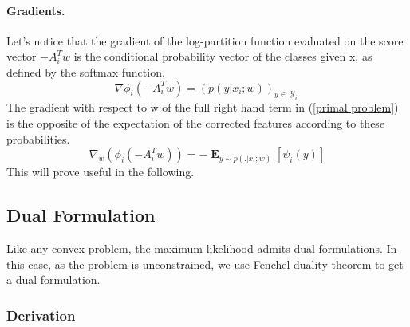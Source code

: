 \documentclass{article}
\DeclareMathOperator{\1}{\mathbb{1}}
\DeclareMathOperator{\E}{\mathbf{E}}
\DeclareMathOperator{\Y}{\mathcal{Y}}
\begin{document}
\paragraph{Gradients.}
Let's notice that the gradient of the log-partition function evaluated on the score vector $-A_i^Tw$ is the conditional probability vector of the classes given x, as defined by the softmax function.
\begin{equation}
	\nabla \phi_i(-A_i^Tw) = (p(y | x_i ; w))_{y \in \Y_i}
\end{equation}
The gradient with respect to w of the full right hand term in (\ref{primal problem}) is the opposite of the expectation of the corrected features according to these probabilities.
\begin{equation}
	\label{primal gradient}
	\nabla_w (\phi_i(-A_i^Tw)) = - \E_{y \sim p(. | x_i ; w)} [\psi_i(y)]
\end{equation}
This will prove useful in the following.

\subsection{Dual Formulation}

Like any convex problem, the maximum-likelihood admits dual formulations.
In this case, as the problem is unconstrained, we use Fenchel duality theorem to get a dual formulation.

\subsubsection*{Derivation}
\end{document}
